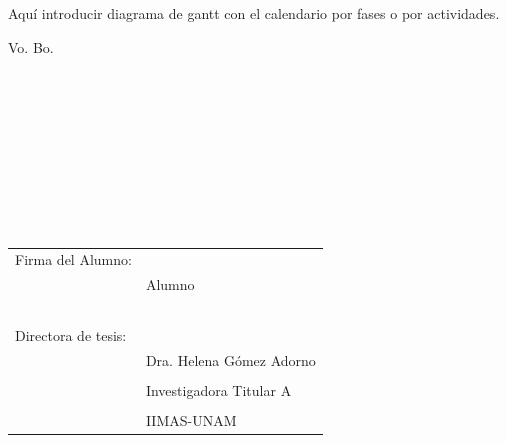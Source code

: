 \documentclass{article}
\begin{document}
Aquí introducir diagrama de gantt con el calendario por fases o por actividades.





\clearpage
\vfill
\Large{Vo. Bo.}
\\    \\    \\    \\    \\  \\    \\    \\    \\    \\   
 
\begin{tabular}{@{}p{6cm}p{7cm}@{}}
    \Large{Firma del Alumno:} & \hrulefill \\
                         & \large{Alumno} \par \\
    \\    \\    \\    \\    \\    
    \Large{Directora de tesis:} & \hrulefill \\
                         & \large{Dra. Helena Gómez Adorno} \\
    \Large{} & \\
                         & \large{Investigadora Titular A} \\
    \Large{} &  \\
                         & \large{IIMAS-UNAM} \\
    
\end{tabular}
\end{document}
